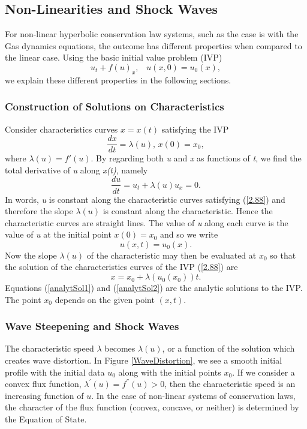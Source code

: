 \documentclass[]{article}
\begin{document}
	\subsection{Non-Linearities and Shock Waves}
		For non-linear hyperbolic conservation law systems, such as the case is with the Gas dynamics equations, the outcome has different properties when compared to the linear case. Using the basic initial value problem (IVP)
		\begin{equation}
			u_t + f(u)_x  \mbox{, } \mbox{  }u(x,0) = u_0(x),
			\label{IVP1}
		\end{equation} we explain these different properties in the following sections.
	
		\subsubsection{Construction of Solutions on Characteristics}
			Consider characteristics curves $ x = x(t) $ satisfying the IVP
			\begin{equation}
				\frac{dx}{dt} = \lambda(u) \mbox{, } x(0) = x_0,
				\label{2.88}
			\end{equation}
			where $ \lambda(u) = f'(u) $. By regarding both \textit{u} and \textit{x} as functions of \textit{t}, we find the total derivative  of \textit{u} along \textit{x(t)}, namely
			\begin{equation}
				\frac{du}{dt} = u_t + \lambda(u)u_x = 0.
			\end{equation}	
			In words, \textit{u} is constant along the characteristic curves satisfying (\ref{2.88}) and therefore the slope $ \lambda(u) $ is constant along the characteristic. Hence the characteristic curves are straight lines. The value of \textit{u} along each curve is the value of \textit{u} at the initial point $ x(0) = x_0 $ and so we write
			\begin{equation}
				u(x,t) = u_0(x).
				\label{analytSol1}
			\end{equation}
			Now the slope $ \lambda(u) $ of the characteristic may then be evaluated at $ x_0 $ so that the solution of the characteristics curves of the IVP (\ref{2.88}) are
			\begin{equation}
				x = x_0 + \lambda(u_0(x_0))t.
				\label{analytSol2}
			\end{equation}
			Equations (\ref{analytSol1}) and (\ref{analytSol2}) are the analytic solutions to the IVP. The point $ x_0 $ depends on the given point $ (x,t) $.
				
		\subsubsection{Wave Steepening and Shock Waves}
			The characteristic speed $ \lambda $ becomes $ \lambda(u) $, or a function of the solution which creates wave distortion. In Figure \ref{WaveDistortion}, we see a smooth initial profile with the initial data $ u_0 $ along with the initial points $ x_0 $. If we consider a convex flux function, $ \lambda^{'}(u) = f^{''}(u) > 0 $, then the characteristic speed  is an increasing function of $ u $. In the case of non-linear systems of conservation laws, the character of the flux function (convex, concave, or neither) is determined by the Equation of State.
	 
\end{document}
